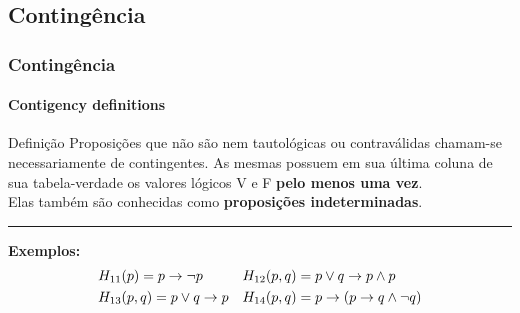 \subsection{Contingência}
%
\begin{frame}[t]
    \frametitle{Contingência}
    \framesubtitle{Contigency definitions}
    \begin{alertblock}{Definição}
        \indent Proposições que não são nem tautológicas ou contraválidas chamam-se necessariamente de contingentes. As mesmas possuem em sua última coluna de sua tabela-verdade os valores lógicos V e F \textbf{pelo menos uma vez}.\\
        \hfill \break
        \indent Elas também são conhecidas como \textbf{proposições indeterminadas}. \\
        {\color{red} \rule{\linewidth}{0.5pt}}
        \textbf{Exemplos:}
        \begin{align*}
            &H_{11}(p) = p \rightarrow \lnot p                     &        & H_{12}(p,q) = p \lor q \rightarrow p \land p \\
            &H_{13}(p,q) = p \lor q \rightarrow p                &        & H_{14}(p,q) = p \rightarrow (p \rightarrow q \land \lnot q)
        \end{align*}
    \end{alertblock}
\end{frame}